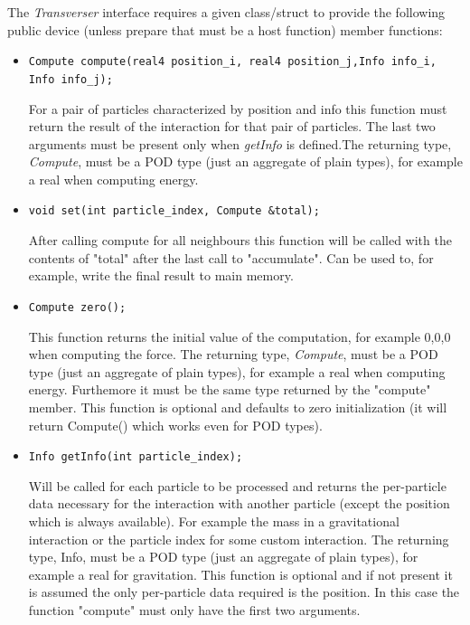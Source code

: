 \documentclass[ twoside,openright,titlepage,numbers=noenddot,%
headinclude,footinclude,cleardoublepage=empty,abstract=on,
BCOR=5mm,paper=a4,fontsize=11pt, dvipsnames
]{scrreprt}
\def\ucpp{uammd_cpp_lexer.py:UAMMDCppLexer -x}
\begin{document}
The \emph{Transverser} interface requires a given class/struct to provide the following public device (unless prepare that must be a host function) member functions:

\begin{itemize}
\item \texttt{Compute compute(real4 position_i, real4 position_j,Info info_i, Info info_j);}

  
  For a pair of particles
  characterized by position and info this function must return the
  result of the interaction for that pair of particles. The last
  two arguments must be present only when \emph{getInfo} is defined.The
  returning type, \emph{Compute}, must be a POD type (just an aggregate of
  plain types), for example a real when computing energy.

\item \texttt{void set(int particle_index, Compute &total);}

  
   After calling compute for all neighbours this function will be called with the contents of "total" after the last call to "accumulate".
   Can be used to, for example, write the final result to main memory.

 \item \texttt{Compute zero();}

   
   This function returns the initial value of the computation, for example {0,0,0} when computing the force. 
   The returning type, \emph{Compute}, must be a POD type (just an aggregate of plain types), for example a real when computing energy. Furthemore it must be the same type returned by the "compute" member.
   This function is optional and defaults to zero initialization (it will return Compute() which works even for POD types).
    
 \item \texttt{Info getInfo(int particle_index);}

   
   Will be called for each particle to be processed and returns the per-particle data necessary for the interaction with another particle (except the position which is always available). For example the mass in a gravitational interaction or the particle index for some custom interaction.
   The returning type, Info, must be a POD type (just an aggregate of plain types), for example a real for gravitation.
   This function is optional and if not present it is assumed the only per-particle data required is the position. 
   In this case the function "compute" must only have the first two arguments.


\end{itemize}
\end{document}
